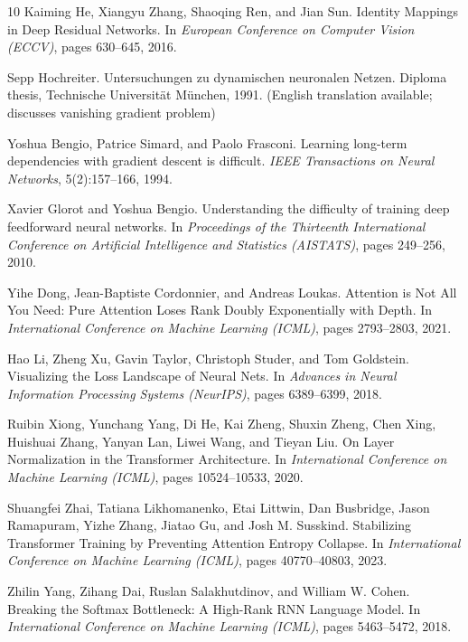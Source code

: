 \documentclass[11pt]{article}
\theoremstyle{definition}
\begin{document}
\begin{thebibliography}{10}
Kaiming He, Xiangyu Zhang, Shaoqing Ren, and Jian Sun.
\newblock Identity Mappings in Deep Residual Networks.
\newblock In \emph{European Conference on Computer Vision (ECCV)}, pages 630--645, 2016.

Sepp Hochreiter.
\newblock Untersuchungen zu dynamischen neuronalen Netzen.
\newblock Diploma thesis, Technische Universit\"at M\"unchen, 1991.
\newblock (English translation available; discusses vanishing gradient problem)

Yoshua Bengio, Patrice Simard, and Paolo Frasconi.
\newblock Learning long-term dependencies with gradient descent is difficult.
\newblock \emph{IEEE Transactions on Neural Networks}, 5(2):157--166, 1994.

Xavier Glorot and Yoshua Bengio.
\newblock Understanding the difficulty of training deep feedforward neural networks.
\newblock In \emph{Proceedings of the Thirteenth International Conference on Artificial Intelligence and Statistics (AISTATS)}, pages 249--256, 2010.

Yihe Dong, Jean-Baptiste Cordonnier, and Andreas Loukas.
\newblock Attention is Not All You Need: Pure Attention Loses Rank Doubly Exponentially with Depth.
\newblock In \emph{International Conference on Machine Learning (ICML)}, pages 2793--2803, 2021.

Hao Li, Zheng Xu, Gavin Taylor, Christoph Studer, and Tom Goldstein.
\newblock Visualizing the Loss Landscape of Neural Nets.
\newblock In \emph{Advances in Neural Information Processing Systems (NeurIPS)}, pages 6389--6399, 2018.

Ruibin Xiong, Yunchang Yang, Di He, Kai Zheng, Shuxin Zheng, Chen Xing, Huishuai Zhang, Yanyan Lan, Liwei Wang, and Tieyan Liu.
\newblock On Layer Normalization in the Transformer Architecture.
\newblock In \emph{International Conference on Machine Learning (ICML)}, pages 10524--10533, 2020.

Shuangfei Zhai, Tatiana Likhomanenko, Etai Littwin, Dan Busbridge, Jason Ramapuram, Yizhe Zhang, Jiatao Gu, and Josh M. Susskind.
\newblock Stabilizing Transformer Training by Preventing Attention Entropy Collapse.
\newblock In \emph{International Conference on Machine Learning (ICML)}, pages 40770--40803, 2023.

Zhilin Yang, Zihang Dai, Ruslan Salakhutdinov, and William W. Cohen.
\newblock Breaking the Softmax Bottleneck: A High-Rank RNN Language Model.
\newblock In \emph{International Conference on Machine Learning (ICML)}, pages 5463--5472, 2018.


\end{thebibliography}
\end{document}
